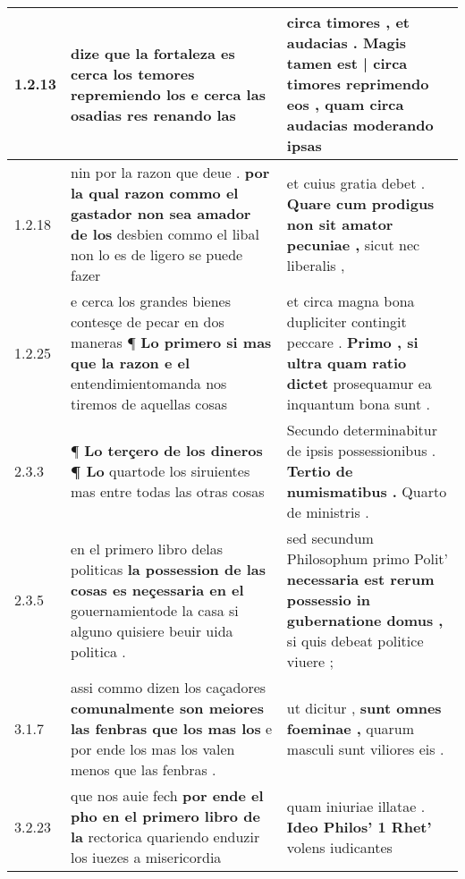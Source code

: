 \begin{tabular}{|p{1cm}|p{6.5cm}|p{6.5cm}|}

\hline
1.2.13 & dize \textbf{ que la fortaleza es cerca los temores repremiendo los } e cerca las osadias res renando las & circa timores , et audacias . \textbf{ Magis tamen est | circa timores reprimendo eos , } quam circa audacias moderando ipsas \\\hline
1.2.18 & nin por la razon que deue . \textbf{ por la qual razon commo el gastador non sea amador de los } desbien commo el libal non lo es de ligero se puede fazer & et cuius gratia debet . \textbf{ Quare cum prodigus non sit amator pecuniae , } sicut nec liberalis , \\\hline
1.2.25 & e cerca los grandes bienes contesçe de pecar en dos maneras ¶ \textbf{ Lo primero si mas que la razon e el } entendimientomanda nos tiremos de aquellas cosas & et circa magna bona dupliciter contingit peccare . \textbf{ Primo , si ultra quam ratio dictet } prosequamur ea inquantum bona sunt . \\\hline
2.3.3 & ¶ \textbf{ Lo terçero de los dineros ¶ Lo } quartode los siruientes mas entre todas las otras cosas & Secundo determinabitur de ipsis possessionibus . \textbf{ Tertio de numismatibus . } Quarto de ministris . \\\hline
2.3.5 & en el primero libro delas politicas \textbf{ la possession de las cosas es neçessaria en el } gouernamientode la casa si alguno quisiere beuir uida politica . & sed secundum Philosophum primo Polit’ \textbf{ necessaria est rerum possessio in gubernatione domus , } si quis debeat politice viuere ; \\\hline
3.1.7 & assi commo dizen los caçadores \textbf{ comunalmente son meiores las fenbras que los mas los } e por ende los mas los valen menos que las fenbras . & ut dicitur , \textbf{ sunt omnes foeminae , } quarum masculi sunt viliores eis . \\\hline
3.2.23 & que nos auie fech \textbf{ por ende el pho en el primero libro de la } rectorica quariendo enduzir los iuezes a misericordia & quam iniuriae illatae . \textbf{ Ideo Philos’ 1 Rhet’ } volens iudicantes \\\hline

\end{tabular}
